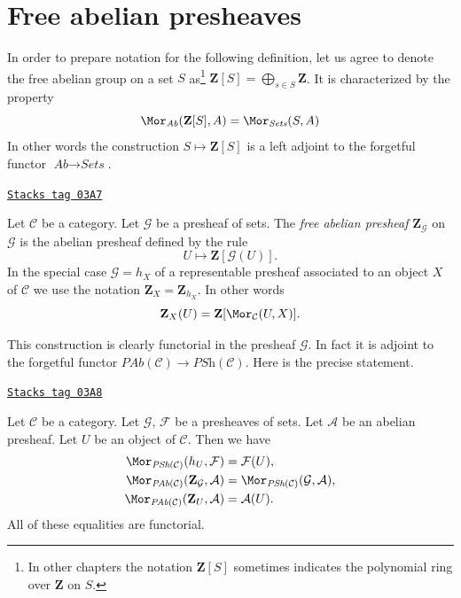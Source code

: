 \section{Free abelian presheaves}
\label{sites-modules-section-free-abelian-presheaf}
In order to prepare notation for the following definition, let us agree
to denote the free abelian group on a set $S$ as\footnote{In other chapters
the notation $\mathbf{Z}[S]$ sometimes indicates the polynomial ring over
$\mathbf{Z}$ on $S$.}
$\mathbf{Z}[S] = \bigoplus_{s \in S} \mathbf{Z}$. It is characterized
by the property
$$
\Mor_{\textit{Ab}}(\mathbf{Z}[S], A)
=
\Mor_{\textit{Sets}}(S, A)
$$
In other words the construction $S \mapsto \mathbf{Z}[S]$ is a left adjoint
to the forgetful functor $\textit{Ab} \to \textit{Sets}$.

\begin{definition}
\label{sites-modules-definition-free-abelian-presheaf-on}
\href{https://stacks.math.columbia.edu/tag/03A7}{\texttt{Stacks tag 03A7}}

Let $\mathcal{C}$ be a category. Let $\mathcal{G}$ be a presheaf of sets.
The {\it free abelian presheaf} $\mathbf{Z}_\mathcal{G}$ on $\mathcal{G}$
is the abelian presheaf defined by the rule
$$
U \longmapsto \mathbf{Z}[\mathcal{G}(U)].
$$
In the special case $\mathcal{G} = h_X$ of a representable presheaf
associated to an object $X$ of $\mathcal{C}$
we use the notation $\mathbf{Z}_X = \mathbf{Z}_{h_X}$. In other words
$$
\mathbf{Z}_X(U) = \mathbf{Z}[\Mor_\mathcal{C}(U, X)].
$$
\end{definition}

This construction is clearly functorial in the presheaf $\mathcal{G}$.
In fact it is adjoint to the forgetful functor
$\textit{PAb}(\mathcal{C}) \to \textit{PSh}(\mathcal{C})$.
Here is the precise statement.

\begin{lemma}
\label{sites-modules-lemma-obvious-adjointness}
\href{https://stacks.math.columbia.edu/tag/03A8}{\texttt{Stacks tag 03A8}}

Let $\mathcal{C}$ be a category.
Let $\mathcal{G}$, $\mathcal{F}$ be a presheaves of sets.
Let $\mathcal{A}$ be an abelian presheaf.
Let $U$ be an object of $\mathcal{C}$. Then
we have
\begin{align*}
\Mor_{\textit{PSh}(\mathcal{C})}(h_U, \mathcal{F})
& =
\mathcal{F}(U), \\
\Mor_{\textit{PAb}(\mathcal{C})}(\mathbf{Z}_\mathcal{G}, \mathcal{A})
& =
\Mor_{\textit{PSh}(\mathcal{C})}(\mathcal{G}, \mathcal{A}), \\
\Mor_{\textit{PAb}(\mathcal{C})}(\mathbf{Z}_U, \mathcal{A})
& =
\mathcal{A}(U).
\end{align*}
All of these equalities are functorial.
\end{lemma}

